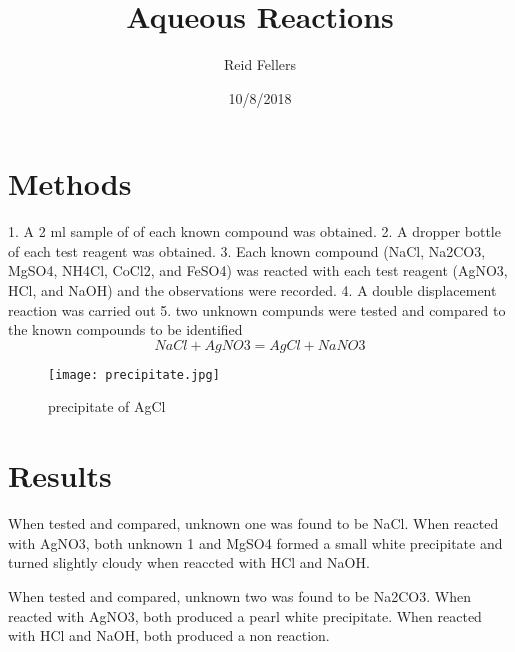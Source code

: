 \documentclass[12pt]{article}
\begin{document}
\title{Aqueous Reactions}
\author{Reid Fellers}
\date{10/8/2018}
\maketitle

\section{Methods}
\label{sec:methods}

1. A 2 ml sample of of each known compound was obtained.
2. A dropper bottle of each test reagent was obtained.
3. Each known compound (NaCl, Na2CO3, MgSO4, NH4Cl, CoCl2, and FeSO4) was reacted with each test reagent (AgNO3, HCl, and NaOH) and the observations were recorded.
4. A double displacement reaction was carried out
5. two unknown compunds were tested and compared to the known compounds to be identified
\begin {equation}
 \label {eq:1}
 NaCl + AgNO3 = AgCl + NaNO3
 \end {equation}
 \begin {figure}[ht]
   \centering
   \texttt{[image: precipitate.jpg]}
   \caption{precipitate of AgCl}
   \label{fig : AgCl precipitate}
   \end{figure}
\section{Results}
\label{sec:results}
When tested and compared, unknown one was found to be NaCl. When reacted with AgNO3, both unknown 1 and MgSO4 formed a small white precipitate and turned slightly cloudy when reaccted with HCl and NaOH.

When tested and compared, unknown two was found to be Na2CO3. When reacted with AgNO3, both produced a pearl white precipitate. When reacted with HCl and NaOH, both produced a non reaction.
\end{document}
